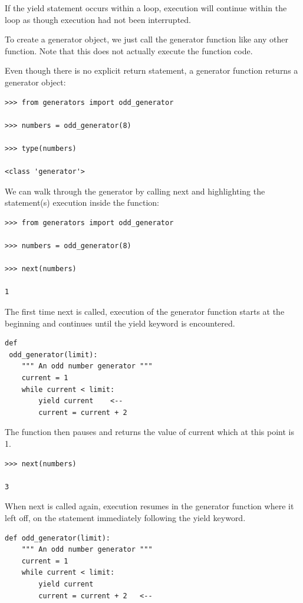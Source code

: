 \documentclass{article}
\begin{document}
If the yield statement occurs within a loop, execution will continue within the loop as though execution had not been interrupted.

To create a generator object, we just call the generator function  like any other function. Note that this does not actually execute the function code.

Even though there is no explicit return statement, a generator function returns a generator object:

\begin{lstlisting}
>>> from generators import odd_generator

>>> numbers = odd_generator(8)

>>> type(numbers)

<class 'generator'>
\end{lstlisting}

We can walk through the generator by calling next and highlighting the statement(s) execution inside the function:

\begin{lstlisting}
>>> from generators import odd_generator

>>> numbers = odd_generator(8)

>>> next(numbers)

1
\end{lstlisting}

The first time next is called, execution of the generator function starts at the beginning and continues until the yield keyword is encountered. 

\begin{lstlisting}
def
 odd_generator(limit):
    """ An odd number generator """
    current = 1
    while current < limit:
        yield current    <--
        current = current + 2
\end{lstlisting}
The function then pauses and returns the value of current which at this point is 1. 

\begin{lstlisting}
>>> next(numbers)

3
\end{lstlisting}

When next is called again, execution resumes in the generator function where it left off, on the statement immediately following the yield keyword.

\begin{lstlisting}
def odd_generator(limit):
    """ An odd number generator """
    current = 1
    while current < limit:
        yield current    
        current = current + 2   <--
\end{lstlisting}
\end{document}
